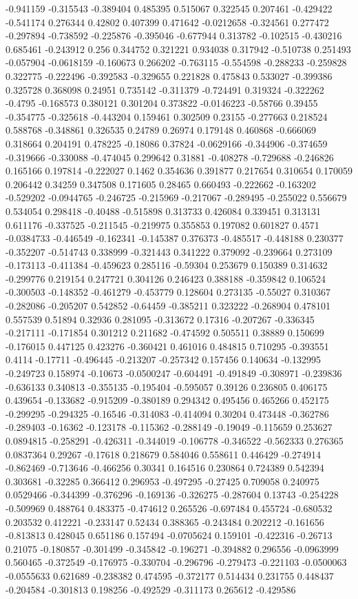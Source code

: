 -0.941159 -0.315543 -0.389404 0.485395 0.515067 0.322545 0.207461 -0.429422 -0.541174 0.276344 0.42802 0.407399 0.471642 -0.0212658 -0.324561 0.277472 -0.297894 -0.738592 -0.225876 -0.395046 -0.677944 0.313782 -0.102515 -0.430216 0.685461 -0.243912 0.256 0.344752 0.321221 0.934038 0.317942 -0.510738 0.251493 -0.057904 -0.0618159 -0.160673 0.266202 -0.763115 -0.554598 -0.288233 -0.259828 0.322775 -0.222496 -0.392583 -0.329655 0.221828 0.475843 0.533027 -0.399386 0.325728 0.368098 0.24951 0.735142 -0.311379 -0.724491 0.319324 -0.322262 -0.4795 -0.168573 0.380121 0.301204 0.373822 -0.0146223 -0.58766 0.39455 -0.354775 -0.325618 -0.443204 0.159461 0.302509 0.23155 -0.277663 0.218524 0.588768 -0.348861 0.326535 0.24789 0.26974 0.179148 0.460868 -0.666069 0.318664 0.204191 0.478225 -0.18086 0.37824 -0.0629166 -0.344906 -0.374659 -0.319666 -0.330088 -0.474045 0.299642 0.31881 -0.408278 -0.729688 -0.246826 0.165166 0.197814 -0.222027 0.1462 0.354636 0.391877 0.217654 0.310654 0.170059 0.206442 0.34259 0.347508 0.171605 0.28465 0.660493 -0.222662 -0.163202 -0.529202 -0.0944765 -0.246725 -0.215969 -0.217067 -0.289495 -0.255022 0.556679 0.534054 0.298418 -0.40488 -0.515898 0.313733 0.426084 0.339451 0.313131 0.611176 -0.337525 -0.211545 -0.219975 0.355853 0.197082 0.601827 0.4571 -0.0384733 -0.446549 -0.162341 -0.145387 0.376373 -0.485517 -0.448188 0.230377 -0.352207 -0.514743 0.338999 -0.321443 0.341222 0.379092 -0.239664 0.273109 -0.173113 -0.411384 -0.459623 0.285116 -0.59304 0.253679 0.150389 0.314632 -0.299776 0.219154 0.247721 0.304126 0.246423 0.388188 -0.359842 0.106524 -0.300503 -0.148352 -0.461279 -0.453779 0.128604 0.273135 -0.55027 0.310367 -0.282086 -0.205207 0.542852 -0.64459 -0.385211 0.323222 -0.268904 0.478101 0.557539 0.51894 0.32936 0.281095 -0.313672 0.17316 -0.207267 -0.336345 -0.217111 -0.171854 0.301212 0.211682 -0.474592 0.505511 0.38889 0.150699 -0.176015 0.447125 0.423276 -0.360421 0.461016 0.484815 0.710295 -0.393551 0.4114 -0.17711 -0.496445 -0.213207 -0.257342 0.157456 0.140634 -0.132995 -0.249723 0.158974 -0.10673 -0.0500247 -0.604491 -0.491849 -0.308971 -0.239836 -0.636133 0.340813 -0.355135 -0.195404 -0.595057 0.39126 0.236805 0.406175 0.439654 -0.133682 -0.915209 -0.380189 0.294342 0.495456 0.465266 0.452175 -0.299295 -0.294325 -0.16546 -0.314083 -0.414094 0.30204 0.473448 -0.362786 -0.289403 -0.16362 -0.123178 -0.115362 -0.288149 -0.19049 -0.115659 0.253627 0.0894815 -0.258291 -0.426311 -0.344019 -0.106778 -0.346522 -0.562333 0.276365 0.0837364 0.29267 -0.17618 0.218679 0.584046 0.558611 0.446429 -0.274914 -0.862469 -0.713646 -0.466256 0.30341 0.164516 0.230864 0.724389 0.542394 0.303681 -0.32285 0.366412 0.296953 -0.497295 -0.27425 0.709058 0.240975 0.0529466 -0.344399 -0.376296 -0.169136 -0.326275 -0.287604 0.13743 -0.254228 -0.509969 0.488764 0.483375 -0.474612 0.265526 -0.697484 0.455724 -0.680532 0.203532 0.412221 -0.233147 0.52434 0.388365 -0.243484 0.202212 -0.161656 -0.813813 0.428045 0.651186 0.157494 -0.0705624 0.159101 -0.422316 -0.26713 0.21075 -0.180857 -0.301499 -0.345842 -0.196271 -0.394882 0.296556 -0.0963999 0.560465 -0.372549 -0.176975 -0.330704 -0.296796 -0.279473 -0.221103 -0.0500063 -0.0555633 0.621689 -0.238382 0.474595 -0.372177 0.514434 0.231755 0.448437 -0.204584 -0.301813 0.198256 -0.492529 -0.311173 0.265612 -0.429586 